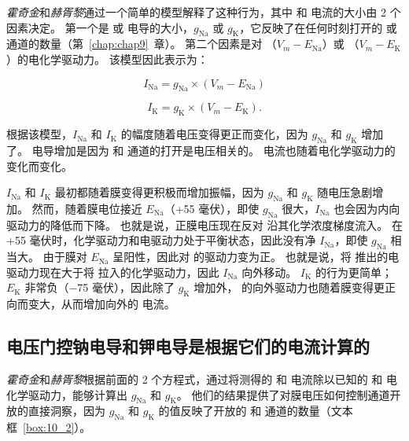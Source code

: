 \textit{霍奇金}和\textit{赫胥黎}通过一个简单的模型解释了这种行为，其中  和  电流的大小由 2 个因素决定。
第一个是  或  电导的大小，$g_\text{Na}$ 或 $g_\text{K}$，它反映了在任何时刻打开的  或  通道的数量（第~\ref{chap:chap9}~章）。
第二个因素是对  （$V_m − E_{\text{Na}}$）或 （$V_m − E_\text{K}$）的电化学驱动力。
该模型因此表示为：

\begin{equation}
	I_\text{Na} = g_\text{Na} \times (V_m - E_{\text{Na}})
\end{equation}

\begin{equation}
	I_\text{K} = g_\text{K} \times (V_m - E_\text{K}).
\end{equation}


根据该模型，$I_\text{Na}$ 和 $I_\text{K}$ 的幅度随着电压变得更正而变化，因为 $g_\text{Na}$ 和 $g_\text{K}$ 增加了。
电导增加是因为  和  通道的打开是电压相关的。
电流也随着电化学驱动力的变化而变化。


$I_\text{Na}$ 和 $I_\text{K}$ 最初都随着膜变得更积极而增加振幅，因为 $g_\text{Na}$ 和 $g_\text{K}$ 随电压急剧增加。
然而，随着膜电位接近 $E_{\text{Na}}$（+55 毫伏），即使 $g_\text{Na}$ 很大，$I_\text{Na}$ 也会因为内向驱动力的降低而下降。
也就是说，正膜电压现在反对  沿其化学浓度梯度流入。
在 +55 毫伏时，化学驱动力和电驱动力处于平衡状态，因此没有净 $I_\text{Na}$，即使 $g_\text{Na}$ 相当大。
由于膜对 $E_{\text{Na}}$ 呈阳性，因此对  的驱动力变为正。
也就是说，将  推出的电驱动力现在大于将  拉入的化学驱动力，因此 $I_\text{Na}$ 向外移动。
$I_\text{K}$ 的行为更简单；
$E_\text{K}$ 非常负（−75 毫伏），因此除了 $g_\text{K}$ 增加外， 的向外驱动力也随着膜变得更正向而变大，从而增加向外的  电流。



\subsection{电压门控钠电导和钾电导是根据它们的电流计算的}

\textit{霍奇金}和\textit{赫胥黎}根据前面的 2 个方程式，通过将测得的  和  电流除以已知的  和  电化学驱动力，能够计算出 $g_\text{Na}$ 和 $g_\text{K}$。
他们的结果提供了对膜电压如何控制通道开放的直接洞察，因为 $g_\text{Na}$ 和 $g_\text{K}$ 的值反映了开放的  和  通道的数量（文本框~\ref{box:10_2}）。


